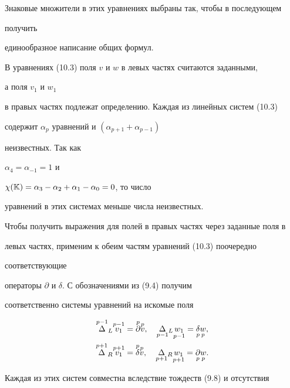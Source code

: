 Знаковые множители в этих уравнениях выбраны так, чтобы в последующем 


получить  


единообразное написание общих формул. 


 


В уравнениях (10.3) поля $v$ и $w$ в левых частях считаются заданными, 


а поля $v_1$ и $w_1$ 


в правых частях подлежат определению. Каждая из линейных систем (10.3) 


содержит $\alpha_p$ уравнений и $(\alpha_{p+1}+\alpha_{p-1})$ 


неизвестных. Так как 


$\alpha_4=\alpha_{-1}=1$ и 


$\chi(\Bbb K)=\alpha_3-\alpha_2+\alpha_1-\alpha_0=0$, то число  


уравнений в этих системах меньше числа неизвестных. 


 


Чтобы получить выражения для полей в правых частях через заданные поля в 


левых частях, применим к обеим частям уравнений (10.3) поочередно 


соответствующие 


операторы $\partial$ и $\delta$. С обозначениями из (9.4) получим 


соответственно системы уравнений на искомые поля 


\begin{equation} 


\begin{split} 


\up{p-1}{\Delta}_L\up{p-1}{v_1}&=\up{p}{\partial}\up{p}{v},\quad 


\down{p-1}{\Delta}_L\down{p-1}{w_1}=\down{p}{\delta}\down{p}{w}, \\ 


\up{p+1}{\Delta}_R\up{p+1}{v_1}&=\up{p}{\delta}\up{p}{v},\quad 


\down{p+1}{\Delta}_R\down{p+1}{w_1}=\down{p}{\partial}\down{p}{w}. 


\end{split} 


\end{equation} 


 


Каждая из этих систем совместна вследствие тождеств (9.8) и отсутствия 


